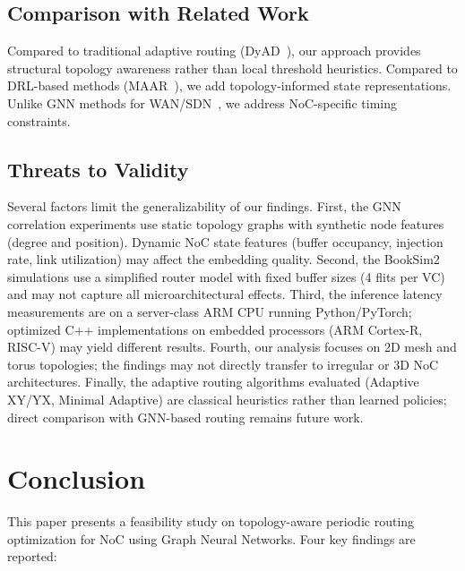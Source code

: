 \documentclass[conference]{IEEEtran}
\begin{document}
\subsection{Comparison with Related Work}

Compared to traditional adaptive routing (DyAD~\cite{dyad2004}), our approach provides structural topology awareness rather than local threshold heuristics. Compared to DRL-based methods (MAAR~\cite{wang2022maar}), we add topology-informed state representations. Unlike GNN methods for WAN/SDN~\cite{g-routing2023}, we address NoC-specific timing constraints.

\subsection{Threats to Validity}

Several factors limit the generalizability of our findings. First, the GNN correlation experiments use static topology graphs with synthetic node features (degree and position). Dynamic NoC state features (buffer occupancy, injection rate, link utilization) may affect the embedding quality. Second, the BookSim2 simulations use a simplified router model with fixed buffer sizes (4 flits per VC) and may not capture all microarchitectural effects. Third, the inference latency measurements are on a server-class ARM CPU running Python/PyTorch; optimized C++ implementations on embedded processors (ARM Cortex-R, RISC-V) may yield different results. Fourth, our analysis focuses on 2D mesh and torus topologies; the findings may not directly transfer to irregular or 3D NoC architectures. Finally, the adaptive routing algorithms evaluated (Adaptive XY/YX, Minimal Adaptive) are classical heuristics rather than learned policies; direct comparison with GNN-based routing remains future work.

\section{Conclusion}
\label{sec:conclusion}

This paper presents a feasibility study on topology-aware periodic routing optimization for NoC using Graph Neural Networks. Four key findings are reported:
\end{document}
